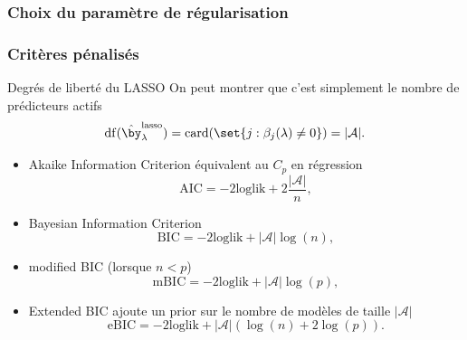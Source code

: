 \documentclass{beamer}\usepackage[]{graphicx}\usepackage[]{color}
\begin{document}
\subsubsection{Choix du paramètre de régularisation}

\begin{frame}
  \frametitle{Critères pénalisés}

  \begin{block}{Degrés de liberté du LASSO}
    On peut montrer que c'est simplement le nombre de prédicteurs actifs
\[
\mathrm{df}(\hat{\by}_\lambda^{\text{lasso}}) = \mathrm{card}(\set{j:\beta_j(\lambda)\neq 0}) = |\mathcal{A}|.
\]
  \end{block}

  \begin{itemize}
    \item \alert{Akaike Information Criterion} équivalent au  $C_p$ en régression
        \begin{equation*}
          \mathrm{AIC} = -2 \mathrm{loglik} + 2\frac{|\mathcal{A}|}{n},
        \end{equation*}
      \item \alert{Bayesian   Information   Criterion}
        \begin{equation*}
          \mathrm{BIC} = -2\mathrm{loglik} + |\mathcal{A}|\log(n),
        \end{equation*}
      \item \alert{modified BIC} (lorsque $n < p$)
        \begin{equation*}
          \mathrm{mBIC} = -2\mathrm{loglik} + |\mathcal{A}|\log(p),
        \end{equation*}
      \item \alert{Extended BIC} ajoute un prior sur le nombre de modèles de taille  $|\mathcal{A}|$
        \begin{equation*}
          \mathrm{eBIC} = -2\mathrm{loglik} + |\mathcal{A}|(\log(n) + 2\log(p)).
        \end{equation*}
      \end{itemize}
\end{frame}
\end{document}
